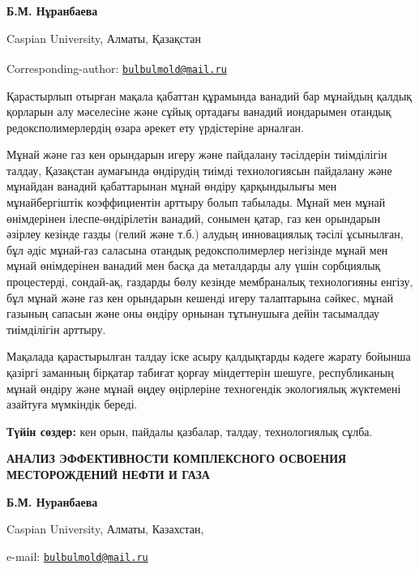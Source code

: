 
\begin{articleheader}

{\bfseries Б.М. Нұранбаева}
\end{articleheader}
\begin{affiliation}
  
Caspian University, Алматы, Қазақстан

\raggedright {\bfseries \textsuperscript{\envelope }}Corresponding-author: \href{mailto:bulbulmold@mail.ru}{\nolinkurl{bulbulmold@mail.ru}}
\end{affiliation}

Қарастырлып отырған мақала қабаттан құрамында ванадий бар мұнайдың
қалдық қорларын алу мәселесіне және сұйық ортадағы ванадий иондарымен
отандық редоксполимерлердің өзара әрекет ету үрдістеріне арналған.

Мұнай және газ кен орындарын игеру және пайдалану тәсілдерін тиімділігін
талдау, Қазақстан аумағында өндірудің тиімді технологиясын пайдалану
және мұнайдан ванадий қабаттарынан мұнай өндіру қарқындылығы мен
мұнайбергіштік коэффициентін арттыру болып табылады. Мұнай мен мұнай
өнімдерінен ілеспе-өндірілетін ванадий, сонымен қатар, газ кен орындарын
әзірлеу кезінде газды (гелий және т.б.) алудың инновациялық тәсілі
ұсынылған, бұл әдіс мұнай-газ саласына отандық редоксполимерлер
негізінде мұнай мен мұнай өнімдерінен ванадий мен басқа да металдарды
алу үшін сорбциялық процестерді, сондай-ақ, газдарды бөлу кезінде
мембраналық технологияны енгізу, бұл мұнай және газ кен орындарын
кешенді игеру талаптарына сәйкес, мұнай газының сапасын және оны өндіру
орнынан тұтынушыға дейін тасымалдау тиімділігін арттыру.

Мақалада қарастырылған талдау іске асыру қалдықтарды кәдеге жарату
бойынша қазіргі заманның бірқатар табиғат қорғау міндеттерін шешуге,
республиканың мұнай өндіру және мұнай өңдеу өңірлеріне техногендік
экологиялық жүктемені азайтуға мүмкіндік береді.

{\bfseries Түйін сөздер:} кен орын, пайдалы қазбалар, талдау, технологиялық
сұлба.

\begin{articleheader}
{\bfseries АНАЛИЗ ЭФФЕКТИВНОСТИ КОМПЛЕКСНОГО ОСВОЕНИЯ МЕСТОРОЖДЕНИЙ НЕФТИ И ГАЗА}

{\bfseries Б.М. Нуранбаева}
\end{articleheader}
\begin{affiliation}

Caspian University, Алматы, Казахстан,

e-mail: \href{mailto:bulbulmold@mail.ru}{\nolinkurl{bulbulmold@mail.ru}}
\end{affiliation}

